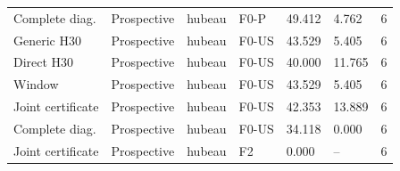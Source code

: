 {\begin{longtable}{p{}p{}p{}p{}p{}p{}p{}}
Complete diag. & Prospective & hubeau & F0-P & 49.412 & 4.762 & 6 \\
Generic H30 & Prospective & hubeau & F0-US & 43.529 & 5.405 & 6 \\
Direct H30 & Prospective & hubeau & F0-US & 40.000 & 11.765 & 6 \\
Window & Prospective & hubeau & F0-US & 43.529 & 5.405 & 6 \\
Joint certificate & Prospective & hubeau & F0-US & 42.353 & 13.889 & 6 \\
Complete diag. & Prospective & hubeau & F0-US & 34.118 & 0.000 & 6 \\
Joint certificate & Prospective & hubeau & F2 & 0.000 & -- & 6 \\
\bottomrule
\end{longtable}
}

